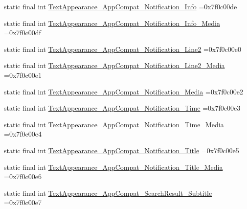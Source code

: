 \begin{DoxyCompactItemize}
\item 
static final int \mbox{\hyperlink{classbr_1_1unb_1_1cic_1_1mp_1_1marketmaster_1_1test_1_1R_1_1style_ae29ec08cac0e7e2db667bcdb009db32d}{Text\+Appearance\+\_\+\+App\+Compat\+\_\+\+Notification\+\_\+\+Info}} =0x7f0c00de
\item 
static final int \mbox{\hyperlink{classbr_1_1unb_1_1cic_1_1mp_1_1marketmaster_1_1test_1_1R_1_1style_acbeb09fd143c1238c4af0d0dd4f00091}{Text\+Appearance\+\_\+\+App\+Compat\+\_\+\+Notification\+\_\+\+Info\+\_\+\+Media}} =0x7f0c00df
\item 
static final int \mbox{\hyperlink{classbr_1_1unb_1_1cic_1_1mp_1_1marketmaster_1_1test_1_1R_1_1style_aa0e4df518ee712f177f4d0254a3a9ec6}{Text\+Appearance\+\_\+\+App\+Compat\+\_\+\+Notification\+\_\+\+Line2}} =0x7f0c00e0
\item 
static final int \mbox{\hyperlink{classbr_1_1unb_1_1cic_1_1mp_1_1marketmaster_1_1test_1_1R_1_1style_ada93fadc0cd41e73b66ffc49eaeb2b69}{Text\+Appearance\+\_\+\+App\+Compat\+\_\+\+Notification\+\_\+\+Line2\+\_\+\+Media}} =0x7f0c00e1
\item 
static final int \mbox{\hyperlink{classbr_1_1unb_1_1cic_1_1mp_1_1marketmaster_1_1test_1_1R_1_1style_a38f992ab7dd73175da6ecdfef18cbcce}{Text\+Appearance\+\_\+\+App\+Compat\+\_\+\+Notification\+\_\+\+Media}} =0x7f0c00e2
\item 
static final int \mbox{\hyperlink{classbr_1_1unb_1_1cic_1_1mp_1_1marketmaster_1_1test_1_1R_1_1style_af19a7e7adce31eec952fe8286a8fc952}{Text\+Appearance\+\_\+\+App\+Compat\+\_\+\+Notification\+\_\+\+Time}} =0x7f0c00e3
\item 
static final int \mbox{\hyperlink{classbr_1_1unb_1_1cic_1_1mp_1_1marketmaster_1_1test_1_1R_1_1style_af71a3a136fc26c4c6f6607c404488312}{Text\+Appearance\+\_\+\+App\+Compat\+\_\+\+Notification\+\_\+\+Time\+\_\+\+Media}} =0x7f0c00e4
\item 
static final int \mbox{\hyperlink{classbr_1_1unb_1_1cic_1_1mp_1_1marketmaster_1_1test_1_1R_1_1style_aaf4092f0f7a49fd333e0e411cb772feb}{Text\+Appearance\+\_\+\+App\+Compat\+\_\+\+Notification\+\_\+\+Title}} =0x7f0c00e5
\item 
static final int \mbox{\hyperlink{classbr_1_1unb_1_1cic_1_1mp_1_1marketmaster_1_1test_1_1R_1_1style_ac42c3002883c4d7fe0ceb58859834837}{Text\+Appearance\+\_\+\+App\+Compat\+\_\+\+Notification\+\_\+\+Title\+\_\+\+Media}} =0x7f0c00e6
\item 
static final int \mbox{\hyperlink{classbr_1_1unb_1_1cic_1_1mp_1_1marketmaster_1_1test_1_1R_1_1style_a97a885a12330b305a63f7b04b98b1165}{Text\+Appearance\+\_\+\+App\+Compat\+\_\+\+Search\+Result\+\_\+\+Subtitle}} =0x7f0c00e7

\end{DoxyCompactItemize}
